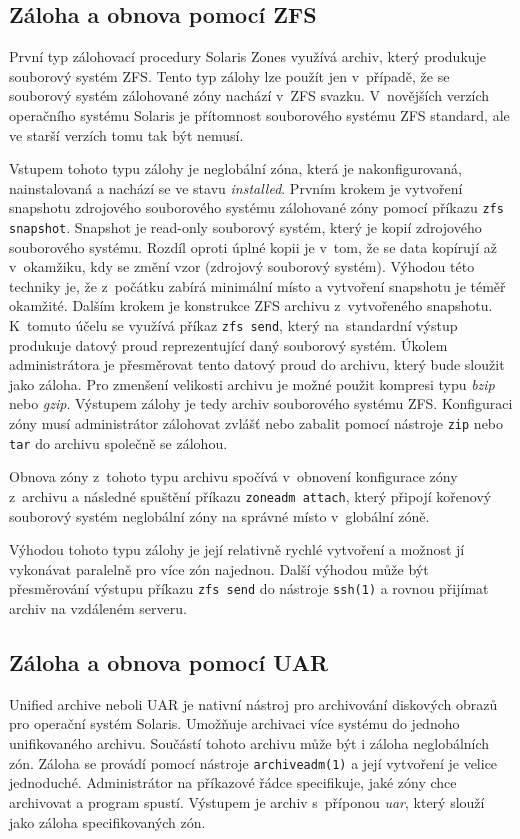 \subsection{Záloha a obnova pomocí ZFS}
\label{chapter:zones:backup:zfs}
První typ zálohovací procedury Solaris Zones využívá archiv, který produkuje souborový systém ZFS. Tento typ zálohy lze použít
jen v~případě, že se souborový systém zálohované zóny nachází v~ZFS svazku. V~novějších verzích operačního systému Solaris je 
přítomnost souborového systému ZFS standard, ale ve starší verzích tomu tak být nemusí.

Vstupem tohoto typu zálohy je neglobální zóna, která je nakonfigurovaná, nainstalovaná a nachází se ve stavu \textit{installed}.
Prvním krokem je vytvoření snapshotu zdrojového souborového systému zálohované zóny pomocí příkazu \verb|zfs snapshot|. Snapshot
je read-only souborový systém, který je kopií zdrojového souborového systému. Rozdíl oproti úplné kopii je v~tom, že se data 
kopírují až v~okamžiku, kdy se změní vzor (zdrojový souborový systém). Výhodou této techniky je, že z~počátku zabírá minimální místo a
vytvoření snapshotu je téměř okamžité. Dalším krokem je konstrukce ZFS archivu z~vytvořeného snapshotu. K~tomuto účelu se využívá příkaz 
\verb|zfs send|, který na~standardní výstup produkuje datový proud reprezentující daný souborový systém. Úkolem administrátora je
přesměrovat tento datový proud do archivu, který bude sloužit jako záloha. Pro zmenšení velikosti archivu je možné použit kompresi 
typu \textit{bzip} nebo \textit{gzip}. Výstupem zálohy je tedy archiv souborového systému ZFS. Konfiguraci zóny musí administrátor 
zálohovat zvlášť nebo zabalit pomocí nástroje \verb|zip| nebo \verb|tar| do archivu společně se zálohou.

Obnova zóny z~tohoto typu archivu spočívá v~obnovení konfigurace zóny z~archivu a následné spuštění příkazu \verb|zoneadm attach|,
který připojí kořenový souborový systém neglobální zóny na správné místo v~globální zóně.

Výhodou tohoto typu zálohy je její relativně rychlé vytvoření a možnost jí vykonávat paralelně pro více zón najednou. Další výhodou
může být přesměrování výstupu příkazu \verb|zfs send| do nástroje \verb|ssh(1)| a rovnou přijímat archiv na vzdáleném serveru.
\subsection{Záloha a obnova pomocí UAR}
\label{chapter:zones:backup:uar}
Unified archive neboli UAR \cite{oracle:solaris:zones:uar} je nativní nástroj pro archivování diskových obrazů pro operační systém
Solaris. Umožňuje archivaci více systému do jednoho unifikovaného archivu. Součástí tohoto archivu může být i záloha neglobálních
zón. Záloha se provádí pomocí nástroje \verb|archiveadm(1)| a její vytvoření je velice jednoduché. Administrátor na příkazové
řádce specifikuje, jaké zóny chce archivovat a program spustí. Výstupem je archiv s~příponou \textit{uar}, který slouží jako záloha
specifikovaných zón.

